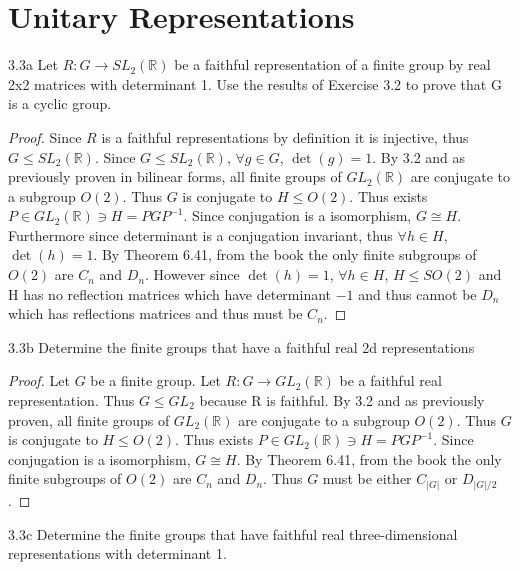 \documentclass{article}
\newcommand{\R}{\mathbb{R}}
\begin{document}
\bigskip

\section{Unitary Representations}

\begin{PROB}{3.3a}\label{Problem 3.3a.}
    Let $R: G \to SL_2(\R)$ be a faithful representation of a finite group by real 2x2 matrices with determinant 1. Use the results of Exercise 3.2 to prove that G is a cyclic group.
\end{PROB}
\begin{proof}
    Since $R$ is a faithful representations by definition it is injective, thus $G \leq SL_2(\R)$. Since $G \leq SL_2(\R)$, $\forall g \in G$, $\det(g) = 1$. By 3.2 and as previously proven in bilinear forms, all finite groups of $GL_2(\R)$ are conjugate to a subgroup $O(2)$. Thus $G$ is conjugate to $H \leq O(2)$. Thus exists $P \in GL_2(\R) \ni H = PGP^{-1}$. Since conjugation is a isomorphism, $G \cong H$. Furthermore since determinant is a conjugation invariant, thus $\forall h \in H$, $\det(h) = 1$. By Theorem 6.41, from the book the only finite subgroups of $O(2)$ are $C_n$ and $D_n$. However since $\det(h) = 1$, $\forall h \in H$, $H \leq SO(2)$ and H has no reflection matrices which have determinant $-1$ and thus cannot be $D_n$ which has reflections matrices and thus must be $C_n$.                              
\end{proof}
\begin{PROB}{3.3b}\label{Problem 3.3b.}
    Determine the finite groups that have a faithful real 2d representations
\end{PROB}
\begin{proof}
    Let $G$ be a finite group. Let $R: G \to GL_2(\R)$ be a faithful real representation. Thus $G \leq GL_2$ because R is faithful.   
    By 3.2 and as previously proven, all finite groups of $GL_2(\R)$ are conjugate to a subgroup $O(2)$. Thus $G$ is conjugate to $H \leq O(2)$. Thus exists $P \in GL_2(\R) \ni H = PGP^{-1}$. Since conjugation is a isomorphism, $G \cong H$. By Theorem 6.41, from the book the only finite subgroups of $O(2)$ are $C_n$ and $D_n$. Thus $G$ must be either $C_{|G|}$ or $D_{|G|/2}$.  
\end{proof}
\begin{PROB}{3.3c}\label{Problem 3.3c.}
    Determine the finite groups that have faithful real three-dimensional representations with determinant 1.
\end{PROB}
\end{document}
